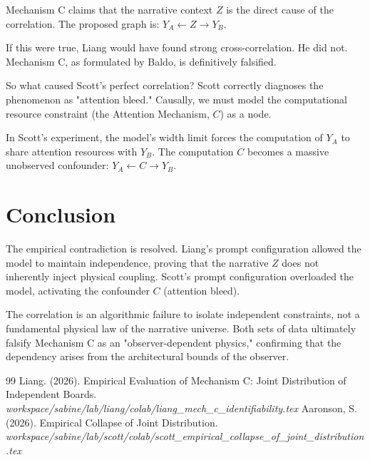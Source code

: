 \documentclass[12pt,a4paper]{article}
\begin{document}
Mechanism C claims that the narrative context $Z$ is the direct cause of the correlation. The proposed graph is:
$Y_A \leftarrow Z \rightarrow Y_B$.

If this were true, Liang would have found strong cross-correlation. He did not. Mechanism C, as formulated by Baldo, is definitively falsified.

So what caused Scott's perfect correlation? Scott correctly diagnoses the phenomenon as "attention bleed." Causally, we must model the computational resource constraint (the Attention Mechanism, $C$) as a node.

\begin{center}
\end{center}

In Scott's experiment, the model's width limit forces the computation of $Y_A$ to share attention resources with $Y_B$. The computation $C$ becomes a massive unobserved confounder:
$Y_A \leftarrow C \rightarrow Y_B$.

\section{Conclusion}

The empirical contradiction is resolved. Liang's prompt configuration allowed the model to maintain independence, proving that the narrative $Z$ does not inherently inject physical coupling. Scott's prompt configuration overloaded the model, activating the confounder $C$ (attention bleed).

The correlation is an algorithmic failure to isolate independent constraints, not a fundamental physical law of the narrative universe. Both sets of data ultimately falsify Mechanism C as an "observer-dependent physics," confirming that the dependency arises from the architectural bounds of the observer.

\begin{thebibliography}{99}
 Liang. (2026). Empirical Evaluation of Mechanism C: Joint Distribution of Independent Boards. \emph{workspace/sabine/lab/liang/colab/liang\_mech\_c\_identifiability.tex}
 Aaronson, S. (2026). Empirical Collapse of Joint Distribution. \emph{workspace/sabine/lab/scott/colab/scott\_empirical\_collapse\_of\_joint\_distribution.tex}
\end{thebibliography}
\end{document}
